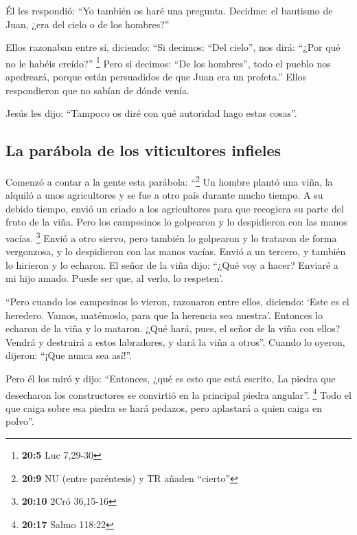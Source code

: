  Él les respondió: ``Yo también os haré una pregunta.
Decidme:  el bautismo de Juan, ¿era del cielo o de los
hombres?''

 Ellos razonaban entre sí, diciendo: ``Si decimos: ``Del
cielo'', nos dirá: ``¿Por qué no le habéis creído?'' \footnote{\textbf{20:5}
  Luc 7,29-30}  Pero si decimos: ``De los hombres'', todo
el pueblo nos apedreará, porque están persuadidos de que Juan era un
profeta.''  Ellos respondieron que no sabían de dónde
venía.

 Jesús les dijo: ``Tampoco os diré con qué autoridad hago
estas cosas''.

\hypertarget{la-paruxe1bola-de-los-viticultores-infieles}{%
\subsection{La parábola de los viticultores
infieles}\label{la-paruxe1bola-de-los-viticultores-infieles}}

 Comenzó a contar a la gente esta parábola: ``\footnote{\textbf{20:9}
  NU (entre paréntesis) y TR añaden ``cierto''} Un hombre plantó una
viña, la alquiló a unos agricultores y se fue a otro país durante mucho
tiempo.  A su debido tiempo, envió un criado a los
agricultores para que recogiera su parte del fruto de la viña. Pero los
campesinos lo golpearon y lo despidieron con las manos vacías.
\footnote{\textbf{20:10} 2Cró 36,15-16}  Envió a otro
siervo, pero también lo golpearon y lo trataron de forma vergonzosa, y
lo despidieron con las manos vacías.  Envió a un tercero,
y también lo hirieron y lo echaron.  El señor de la viña
dijo: ``¿Qué voy a hacer? Enviaré a mi hijo amado. Puede ser que, al
verlo, lo respeten'.

 ``Pero cuando los campesinos lo vieron, razonaron entre
ellos, diciendo: `Este es el heredero. Vamos, matémoslo, para que la
herencia sea nuestra'.  Entonces lo echaron de la viña y
lo mataron. ¿Qué hará, pues, el señor de la viña con ellos?
 Vendrá y destruirá a estos labradores, y dará la viña a
otros''. Cuando lo oyeron, dijeron: ``¡Que nunca sea así!''.

 Pero él los miró y dijo: ``Entonces, ¿qué es esto que
está escrito, La piedra que desecharon los constructores se convirtió en
la principal piedra angular''. \footnote{\textbf{20:17} Salmo 118:22}
 Todo el que caiga sobre esa piedra se hará pedazos, pero
aplastará a quien caiga en polvo''.

